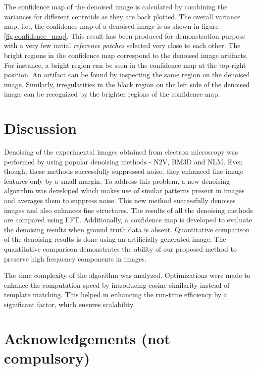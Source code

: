 \documentclass[fleqn,10pt]{wlscirep}
\begin{document}
	The confidence map of the denoised image is calculated by combining the variances\cite{chan1982updating} for different centroids as they are back plotted. The overall variance map, i.e., the confidence map of a denoised image is as shown in figure \ref{fig:confidence_map}. This result has been produced for demonstration purpose with a very few initial \textit{reference patches} selected very close to each other. The bright regions in the confidence map correspond to the denoised image artifacts. For instance, a bright region can be seen in the confidence map at the top-right position. An artifact can be found by inspecting the same region on the denoised image. Similarly, irregularities in the black region on the left side of the denoised image can be recognized by the brighter regions of the confidence map.
	

	
	\section*{Discussion}
	
	Denoising of the experimental images obtained from electron microscopy was performed by using popular denoising methods - N2V, BM3D and NLM. Even though, these methods successfully suppressed noise, they enhanced fine image features only by a small margin. To address this problem, a new denoising algorithm was developed which makes use of similar patterns present in images and averages them to suppress noise. This new method successfully denoises images and also enhances fine structures. The results of all the denoising methods are compared using FFT. Additionally, a confidence map is developed to evaluate the denoising results when ground truth data is absent. Quantitative comparison of the denoising results is done using an artificially generated image. The quantitative comparison demonstrates the ability of our proposed method to preserve high frequency components in images.  
	
	The time complexity of the algorithm was analyzed. Optimizations were made to enhance the computation speed by introducing cosine similarity instead of template matching. This helped in enhancing the run-time efficiency by a significant factor, which ensures scalability.
	
	

	\section*{Acknowledgements (not compulsory)}
	
\end{document}
